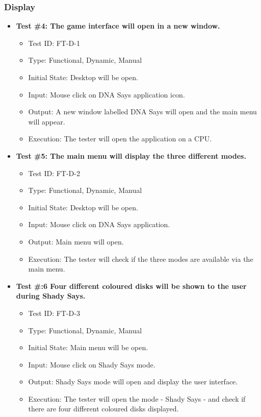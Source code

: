 \documentclass[12pt, titlepage]{article}
\begin{document}
\subsubsection{Display}

\begin{itemize}

\item \textbf{Test \#4: The game interface will open in a new window.}
\begin{itemize}
\item Test ID: FT-D-1
\item Type: Functional, Dynamic, Manual 		
\item Initial State: Desktop will be open. 				
\item Input: Mouse click on DNA Says application icon. 					
\item Output: A new window labelled DNA Says will open and the main menu will appear.  					
\item Execution: The tester will open the application on a CPU.
\end{itemize}

\item \textbf{Test \#5: The main menu will display the three different modes.}
\begin{itemize}
\item Test ID: FT-D-2
\item Type: Functional, Dynamic, Manual	
\item Initial State: Desktop will be open.					
\item Input: Mouse click on DNA Says application.					
\item Output: Main menu will open. 					
\item Execution: The tester will check if the three modes are available via the main menu.
\end{itemize}

\item \textbf{Test \#:6 Four different coloured disks will be shown to the user during Shady Says.}
\begin{itemize}
\item Test ID: FT-D-3
\item Type: Functional, Dynamic, Manual		
\item Initial State: Main menu will be open.					
\item Input: Mouse click on Shady Says mode.					
\item Output: Shady Says mode will open and display the user interface.					
\item Execution: The tester will open the mode - Shady Says - and check if there are four different coloured disks displayed.
\end{itemize}


\end{itemize}
\end{document}
